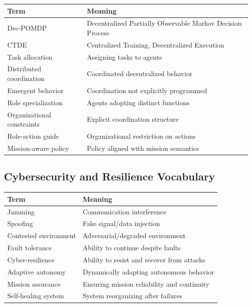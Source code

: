 \documentclass[10pt,a4paper,twocolumn]{article}
\begin{document}
\begin{tabularx}{\columnwidth}{lX}
    \toprule
    Term                       & Meaning                                                    \\
    \midrule
    Dec-POMDP                  & Decentralized Partially Observable Markov Decision Process \\
    CTDE                       & Centralized Training, Decentralized Execution              \\
    Task allocation            & Assigning tasks to agents                                  \\
    Distributed coordination   & Coordinated decentralized behavior                         \\
    Emergent behavior          & Coordination not explicitly programmed                     \\
    Role specialization        & Agents adopting distinct functions                         \\
    Organizational constraints & Explicit coordination structure                            \\
    Role-action guide          & Organizational restriction on actions                      \\
    Mission-aware policy       & Policy aligned with mission semantics                      \\
    \bottomrule
\end{tabularx}


\subsection{Cybersecurity and Resilience Vocabulary}

\begin{tabularx}{\columnwidth}{lX}
    \toprule
    Term                  & Meaning                                     \\
    \midrule
    Jamming               & Communication interference                  \\
    Spoofing              & Fake signal/data injection                  \\
    Contested environment & Adversarial/degraded environment            \\
    Fault tolerance       & Ability to continue despite faults          \\
    Cyber-resilience      & Ability to resist and recover from attacks  \\
    Adaptive autonomy     & Dynamically adapting autonomous behavior    \\
    Mission assurance     & Ensuring mission reliability and continuity \\
    Self-healing system   & System reorganizing after failures          \\
    \bottomrule
\end{tabularx}
\end{document}
